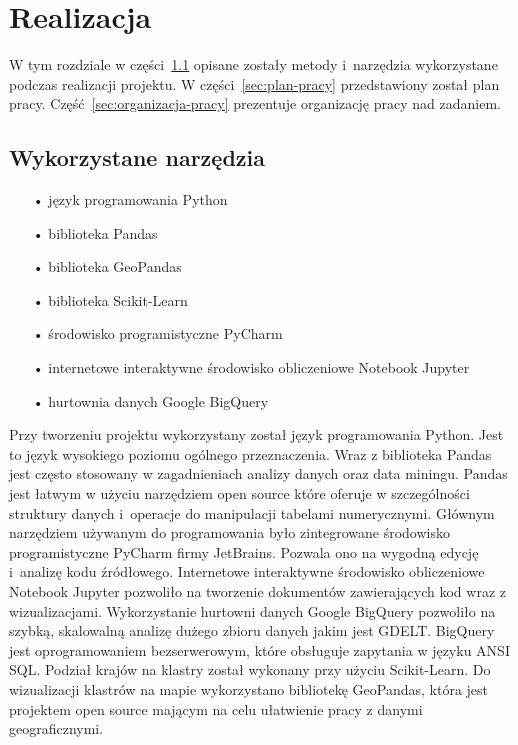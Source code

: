 \documentclass[11pt]{report}
\begin{document}
    \chapter{Realizacja}\label{ch:realizacja}

    W tym rozdziale w części~\ref{sec:wykorzystane-narzędzia} opisane zostały metody i~narzędzia wykorzystane podczas realizacji projektu.
    W części~\ref{sec:plan-pracy} przedstawiony został plan pracy.
    Część~\ref{sec:organizacja-pracy} prezentuje organizację pracy nad zadaniem.


    \section{Wykorzystane narzędzia}\label{sec:wykorzystane-narzędzia}

    \begin{enumerate}
        \item[•] język programowania Python~\cite{python}
        \item[•] biblioteka Pandas~\cite{pandas}
        \item[•] biblioteka GeoPandas~\cite{geopandas}
        \item[•] biblioteka Scikit-Learn~\cite{scikit}
        \item[•] środowisko programistyczne PyCharm~\cite{pycharm}
        \item[•] internetowe interaktywne środowisko obliczeniowe Notebook Jupyter~\cite{jupyter}
        \item[•] hurtownia danych Google BigQuery~\cite{bigquery}
    \end{enumerate}

    Przy tworzeniu projektu wykorzystany został język programowania Python.
    Jest to język wysokiego poziomu ogólnego przeznaczenia.
    Wraz z biblioteka Pandas jest często stosowany w zagadnieniach analizy danych oraz data miningu.
    Pandas jest łatwym w użyciu narzędziem open source które oferuje w szczególności struktury danych i~operacje do manipulacji tabelami numerycznymi.
    Głównym narzędziem używanym do programowania było zintegrowane środowisko programistyczne PyCharm firmy JetBrains.
    Pozwala ono na wygodną edycję i~analizę kodu źródłowego.
    Internetowe interaktywne środowisko obliczeniowe Notebook Jupyter pozwoliło na tworzenie dokumentów zawierających kod wraz z wizualizacjami.
    Wykorzystanie hurtowni danych Google BigQuery pozwoliło na szybką, skalowalną analizę dużego zbioru danych jakim jest GDELT.
    BigQuery jest oprogramowaniem bezserwerowym, które obsługuje zapytania w języku ANSI SQL.
    Podział krajów na klastry został wykonany przy użyciu Scikit-Learn.
    Do wizualizacji klastrów na mapie wykorzystano bibliotekę GeoPandas, która jest projektem open source mającym na celu ułatwienie pracy z danymi geograficznymi.
\end{document}
